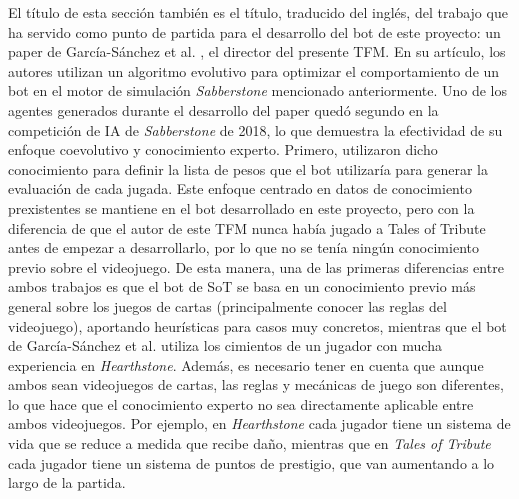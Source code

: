 El título de esta sección también es el título, traducido del inglés, del trabajo que ha servido como punto de partida para el desarrollo del bot de este proyecto: un paper de García-Sánchez et al. \cite{garcia-sanchez_optimizing_2020}, el director del presente TFM. En su artículo, los autores utilizan un algoritmo evolutivo para optimizar el comportamiento de un bot en el motor de simulación \textit{Sabberstone} mencionado anteriormente. Uno de los agentes generados durante el desarrollo del paper quedó segundo en la competición de IA de \textit{Sabberstone} de 2018, lo que demuestra la efectividad de su enfoque coevolutivo y conocimiento experto. Primero, utilizaron dicho conocimiento para definir la lista de pesos que el bot utilizaría para generar la evaluación de cada jugada. Este enfoque centrado en datos de conocimiento prexistentes se mantiene en el bot desarrollado en este proyecto, pero con la diferencia de que el autor de este TFM nunca había jugado a Tales of Tribute antes de empezar a desarrollarlo, por lo que no se tenía ningún conocimiento previo sobre el videojuego. De esta manera, una de las primeras diferencias entre ambos trabajos es que el bot de SoT se basa en un conocimiento previo más general sobre los juegos de cartas (principalmente conocer las reglas del videojuego), aportando heurísticas para casos muy concretos, mientras que el bot de García-Sánchez et al. utiliza los cimientos de un jugador con mucha experiencia en \textit{Hearthstone}. Además, es necesario tener en cuenta que aunque ambos sean videojuegos de cartas, las reglas y mecánicas de juego son diferentes, lo que hace que el conocimiento experto no sea directamente aplicable entre ambos videojuegos. Por ejemplo, en \textit{Hearthstone} cada jugador tiene un sistema de vida que se reduce a medida que recibe daño, mientras que en \textit{Tales of Tribute} cada jugador tiene un sistema de puntos de prestigio, que van aumentando a lo largo de la partida.

